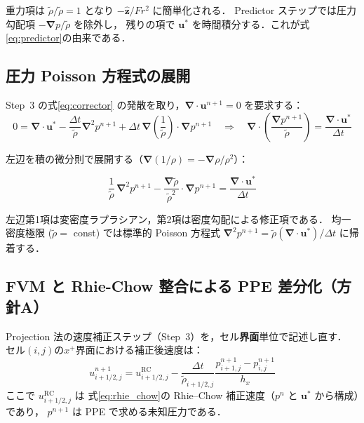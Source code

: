 \documentclass[12pt, a4paper, titlepage]{article}
\newcommand{\jp}[1]{{\normalfont\jpfont #1}}
\newcommand{\bu}{\bm{u}}
\newcommand{\bnabla}{\bm{\nabla}}
\begin{document}
\jp{重力項は $\tilde\rho/\tilde\rho = 1$ となり $-\hat{\bm{z}}/Fr^2$ に簡単化される．
Predictor ステップでは圧力勾配項 $-\bnabla p/\tilde\rho$ を除外し，
残りの項で $\bu^*$ を時間積分する．これが式\eqref{eq:predictor}の由来である．}

\subsection{\jp{圧力 Poisson 方程式の展開}}

\jp{Step~3 の式\eqref{eq:corrector} の発散を取り，$\bnabla\cdot\bu^{n+1}=0$ を要求する：}
\begin{equation}
  0 = \bnabla\cdot\bu^* - \frac{\Delta t}{\tilde\rho}\bnabla^2 p^{n+1}
    + \Delta t\,\bnabla\!\left(\frac{1}{\tilde\rho}\right)\cdot\bnabla p^{n+1}
  \quad\Rightarrow\quad
  \bnabla\cdot\!\left(\frac{\bnabla p^{n+1}}{\tilde\rho}\right) = \frac{\bnabla\cdot\bu^*}{\Delta t}
\end{equation}

\jp{左辺を積の微分則で展開する（$\bnabla(1/\rho) = -\bnabla\rho/\rho^2$）：}
\begin{tcolorbox}[mybox, title={\jp{展開された変密度 Poisson 方程式}}]
\begin{equation}
  \frac{1}{\tilde\rho}\,\bnabla^2 p^{n+1}
  - \frac{\bnabla\tilde\rho}{\tilde\rho^2}\cdot\bnabla p^{n+1}
  = \frac{\bnabla\cdot\bu^*}{\Delta t}
  \label{eq:PPE_expanded}
\end{equation}
\end{tcolorbox}
\jp{左辺第1項は変密度ラプラシアン，第2項は密度勾配による修正項である．
均一密度極限 ($\tilde\rho=$ const) では標準的 Poisson 方程式 $\bnabla^2 p^{n+1} = \tilde\rho(\bnabla\cdot\bu^*)/\Delta t$ に帰着する．}

\subsection{\jp{FVM と Rhie-Chow 整合による PPE 差分化（方針A）}}
\label{sec:PPE_FVM}

\jp{Projection 法の速度補正ステップ（Step~3）を，セル\textbf{界面}単位で記述し直す．
セル$(i,j)$の$x^+$界面における補正後速度は：}
\begin{equation}
  u^{n+1}_{i+1/2,j} = u^{\mathrm{RC}}_{i+1/2,j}
    - \frac{\Delta t}{\tilde\rho_{i+1/2,j}}\frac{p^{n+1}_{i+1,j}-p^{n+1}_{i,j}}{h_x}
  \label{eq:face_correction}
\end{equation}
\jp{ここで $u^{\mathrm{RC}}_{i+1/2,j}$ は
式\eqref{eq:rhie_chow}の Rhie--Chow 補正速度（$p^n$ と $\bu^*$ から構成）であり，
$p^{n+1}$ は PPE で求める未知圧力である．}
\end{document}
